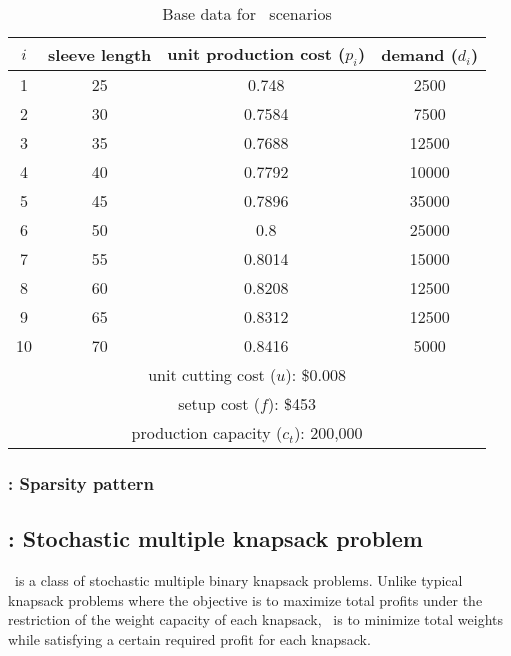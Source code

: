 \begin{table}[]
	\centering
	\caption{Base data for \sizes\ scenarios \cite{journal:JSW1999}}
	\label{sizes:data}
	\begin{tabular}{cccc}
		\hline
		$i$  & sleeve length & unit production cost ($p_i$) & demand ($d_i$) \\ \hline
		1  & 25            & 0.748                & 2500   \\
		2  & 30            & 0.7584               & 7500   \\
		3  & 35            & 0.7688               & 12500  \\
		4  & 40            & 0.7792               & 10000  \\
		5  & 45            & 0.7896               & 35000  \\
		6  & 50            & 0.8                  & 25000  \\
		7  & 55            & 0.8014               & 15000  \\
		8  & 60            & 0.8208               & 12500  \\
		9  & 65            & 0.8312               & 12500  \\
		10 & 70            & 0.8416               & 5000   \\ \hline
		\multicolumn{4}{c}{unit cutting cost ($u$): \$0.008}     \\
		\multicolumn{4}{c}{setup cost ($f$): \$453}              \\ 
		\multicolumn{4}{c}{production capacity ($c_t$): 200,000} \\ \hline
	\end{tabular}
\end{table}

\subsubsection{\sizes: Sparsity pattern}

\subsection{\smkp: Stochastic multiple knapsack problem} \label{SMKP}
\smkp\ is a class of stochastic multiple binary knapsack problems. Unlike typical knapsack problems where the objective is to maximize total profits under the restriction of the weight capacity of each knapsack, \smkp\ is to minimize total weights while satisfying a certain required profit for each knapsack. 

